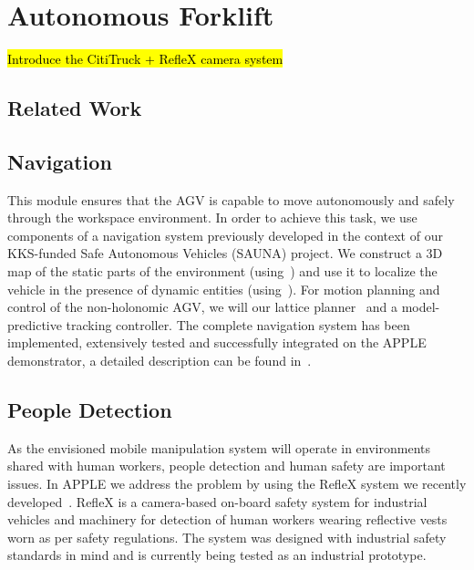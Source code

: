 \section{Autonomous Forklift}
\label{sec:agv}
%
\hl{Introduce the CitiTruck + RefleX camera system}
%
\subsection{Related Work}
\label{subsec:AGV_related_work}
%
\subsection{Navigation}
\label{subsec:navigation}
%
This module ensures that the AGV is capable to move autonomously and safely through the workspace
environment. In order to achieve this task, we use components of a navigation system previously
developed in the context of our KKS-funded Safe Autonomous Vehicles (SAUNA) project. We construct a
3D map of the static parts of the environment (using~\cite{Stoy13}) and use it to localize the
vehicle in the presence of dynamic entities (using~\cite{Vale14}). For motion planning and control
of the non-holonomic AGV, we will our lattice planner~\cite{Ciri14} and a model-predictive tracking
controller. The complete navigation system has been implemented, extensively tested and successfully
integrated on the APPLE demonstrator, a detailed description can be found in~\cite{Andr15}.
%
\subsection{People Detection}
\label{subsec:people_det}
%
As the envisioned mobile manipulation system will operate in environments shared with human workers,
people detection and human safety are important issues. In APPLE we address the problem by using the
RefleX system we recently developed~\cite{Mosb14}. RefleX is a camera-based on-board safety system
for industrial vehicles and machinery for detection of human workers wearing reflective vests worn
as per safety regulations. The system was designed with industrial safety standards in mind and is
currently being tested as an industrial prototype.
%
